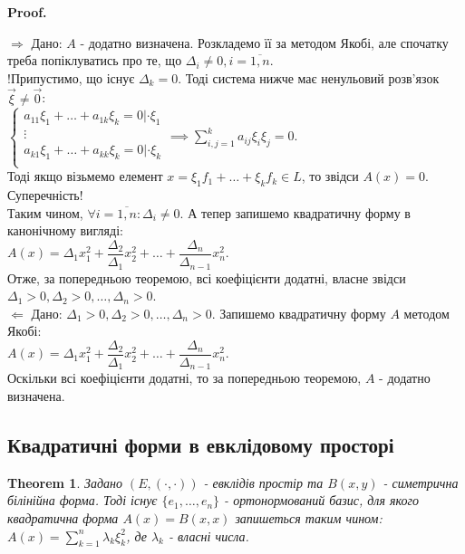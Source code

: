 \documentclass[a4paper, 10pt]{article}
\makeatletter
\def\rightproof{$\boxed{\Rightarrow}$ }
\def\leftproof{$\boxed{\Leftarrow}$ }
\theoremstyle{theoremdd}
\newtheorem{theorem}{Theorem}[subsection]
\renewenvironment{proof}[1][Proof.\\]{\par
\pushQED{\hfill \qed}%
\normalfont \topsep6\p@\@plus6\p@\relax
\trivlist
\item\relax
{\bfseries
#1\@addpunct{.}}\hspace\labelsep\ignorespaces
}{%
\popQED\endtrivlist\@endpefalse
}
\makeatother
\begin{document}
\begin{proof}
\rightproof Дано: $A$ - додатно визначена. Розкладемо її за методом Якобі, але спочатку треба попіклуватись про те, що $\Delta_i \neq 0, i = \overline{1,n}$.\\
!Припустимо, що існує $\Delta_k = 0$. Тоді система нижче має ненульовий розв'язок $\vec{\xi} \neq \vec{0}$:\\
$\begin{cases}
a_{11}\xi_1 + \dots + a_{1k}\xi_k = 0 | \cdot \xi_1 \\
\vdots \\
a_{k1}\xi_1 + \dots + a_{kk}\xi_k = 0 | \cdot \xi_k \\
\end{cases} \implies \displaystyle\sum_{i,j=1}^k a_{ij}\xi_i \xi_j = 0$.\\
Тоді якщо візьмемо елемент $x = \xi_1 f_1 + \dots + \xi_k f_k \in L$, то звідси $A(x) = 0$. Суперечність!\\
Таким чином, $\forall i=\overline{1,n}: \Delta_i \neq 0$. А тепер запишемо квадратичну форму в канонічному вигляді:\\
$A(x) = \Delta_1 x_1^2 + \dfrac{\Delta_2}{\Delta_1} x_2^2 + \dots + \dfrac{\Delta_n}{\Delta_{n-1}} x_n^2$.\\
Отже, за попередньою теоремою, всі коефіцієнти додатні, власне звідси $\Delta_1>0,\Delta_2>0,\dots,\Delta_n>0$.
\bigskip \\
\leftproof Дано: $\Delta_1>0,\Delta_2>0,\dots,\Delta_n>0$. Запишемо квадратичну форму $A$ методом Якобі:\\
$A(x) = \Delta_1 x_1^2 + \dfrac{\Delta_2}{\Delta_1} x_2^2 + \dots + \dfrac{\Delta_n}{\Delta_{n-1}} x_n^2$.\\
Оскільки всі коефіцієнти додатні, то за попередньою теоремою, $A$ - додатно визначена.
\end{proof}

\subsection{Квадратичні форми в евклідовому просторі}
\begin{theorem}
Задано $(E,(\cdot,\cdot))$ - евклідів простір та $B(x,y)$ - симетрична білінійна форма. Тоді існує $\{e_1,\dots,e_n\}$ - ортонормований базис, для якого квадратична форма $A(x) = B(x,x)$ запишеться таким чином:\\
$A(x) = \displaystyle\sum_{k=1}^n \lambda_k \xi_k^2$, де $\lambda_k$ - власні числа.
\end{theorem}
\end{document}
